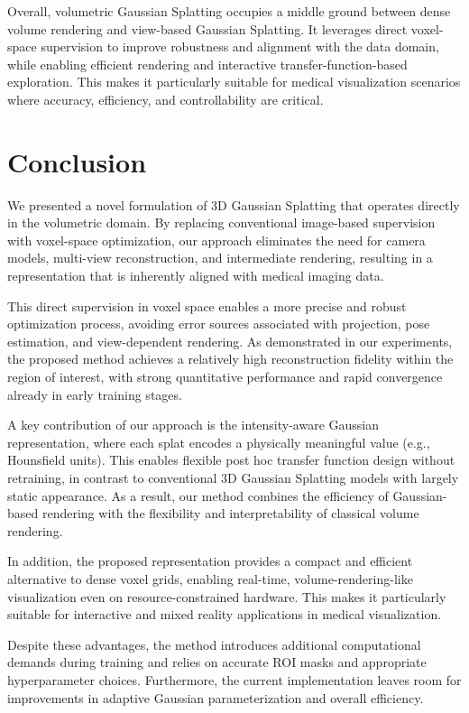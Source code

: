 \documentclass[runningheads]{llncs}
\begin{document}
Overall, volumetric Gaussian Splatting occupies a middle ground between dense volume rendering and view-based Gaussian Splatting. It leverages direct voxel-space supervision to improve robustness and alignment with the data domain, while enabling efficient rendering and interactive transfer-function-based exploration. This makes it particularly suitable for medical visualization scenarios where accuracy, efficiency, and controllability are critical.

\section{Conclusion}

We presented a novel formulation of 3D Gaussian Splatting that operates directly in the volumetric domain. By replacing conventional image-based supervision with voxel-space optimization, our approach eliminates the need for camera models, multi-view reconstruction, and intermediate rendering, resulting in a representation that is inherently aligned with medical imaging data.

This direct supervision in voxel space enables a more precise and robust optimization process, avoiding error sources associated with projection, pose estimation, and view-dependent rendering. As demonstrated in our experiments, the proposed method achieves a relatively high reconstruction fidelity within the region of interest, with strong quantitative performance and rapid convergence already in early training stages.

A key contribution of our approach is the intensity-aware Gaussian representation, where each splat encodes a physically meaningful value (e.g., Hounsfield units). This enables flexible post hoc transfer function design without retraining, in contrast to conventional 3D Gaussian Splatting models with largely static appearance. As a result, our method combines the efficiency of Gaussian-based rendering with the flexibility and interpretability of classical volume rendering.

In addition, the proposed representation provides a compact and efficient alternative to dense voxel grids, enabling real-time, volume-rendering-like visualization even on resource-constrained hardware. This makes it particularly suitable for interactive and mixed reality applications in medical visualization.

Despite these advantages, the method introduces additional computational demands during training and relies on accurate ROI masks and appropriate hyperparameter choices. Furthermore, the current implementation leaves room for improvements in adaptive Gaussian parameterization and overall efficiency.
\end{document}
